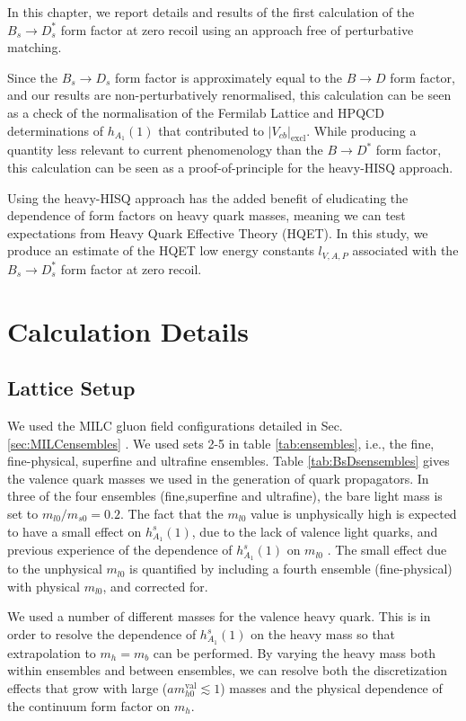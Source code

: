 In this chapter, we report details and results of the first calculation of the $B_s\to D^*_s$ form factor at zero recoil using an approach free of perturbative matching. 

Since the $B_s\to D_s$ form factor is approximately equal to the $B\to D$ form factor, and our results are non-perturbatively renormalised, this calculation can be seen as a check of the normalisation of the Fermilab Lattice and HPQCD determinations of $h_{A_1}(1)$ that contributed to $|V_{cb}|_{\text{excl}}$. While producing a quantity less relevant to current phenomenology than the $B\to D^*$ form factor, this calculation can be seen as a proof-of-principle for the heavy-HISQ approach. 

Using the heavy-HISQ approach has the added benefit of eludicating the dependence of form factors on heavy quark masses, meaning we can test expectations from Heavy Quark Effective Theory (HQET). In this study, we produce an estimate of the HQET low energy constants $l_{V,A,P}$ associated with the $B_s \to D_s^*$ form factor at zero recoil.

\section{Calculation Details}
\label{sec:BsDsstar_deets}

\subsection{Lattice Setup}

We used the MILC gluon field configurations detailed in Sec. \ref{sec:MILCensembles} \cite{Bazavov:2010ru,Bazavov:2012xda}. We used sets 2-5 in table \ref{tab:ensembles}, i.e., the fine, fine-physical, superfine and ultrafine ensembles. Table \ref{tab:BsDsensembles} gives the valence quark masses we used in the generation of quark propagators. In three of the four ensembles (fine,superfine and ultrafine), the bare light mass is set to $m_{l0}/m_{s0} = 0.2$. The fact that the $m_{l0}$ value is unphysically high is expected to have a small effect on $h^s_{A_1}(1)$, due to the lack of valence light quarks, and previous experience of the dependence of $h_{A_1}^s(1)$ on $m_{l0}$ \cite{Harrison:2017fmw}. The small effect due to the unphysical $m_{l0}$ is quantified by including a fourth ensemble (fine-physical) with physical $m_{l0}$, and corrected for.

We used a number of different masses for the valence heavy quark. This is in order to resolve the dependence of $h_{A_1}^s(1)$ on the heavy mass so that extrapolation to $m_h=m_b$ can be performed. By varying the heavy mass both within ensembles and between ensembles, we can resolve both the discretization effects that grow with large ($am^{\text{val}}_{h0} \lesssim 1$) masses and the physical dependence of the continuum form factor on $m_h$.

